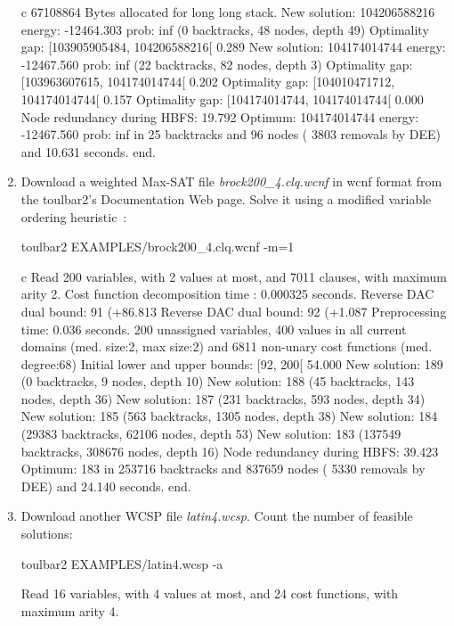 \begin{enumerate}
{\begin{DoxyCode}
c 67108864 Bytes allocated for long long stack.
New solution: 104206588216 energy: -12464.303 prob: inf (0 backtracks, 48 nodes, depth 49)
Optimality gap: [103905905484, 104206588216[ 0.289 %
New solution: 104174014744 energy: -12467.560 prob: inf (22 backtracks, 82 nodes, depth 3)
Optimality gap: [103963607615, 104174014744[ 0.202 %
Optimality gap: [104010471712, 104174014744[ 0.157 %
Optimality gap: [104174014744, 104174014744[ 0.000 %
Node redundancy during HBFS: 19.792 %
Optimum: 104174014744 energy: -12467.560 prob: inf in 25 backtracks and 96 nodes ( 3803 removals by DEE) and 10.631 seconds.
end.
\end{DoxyCode}}
\item Download a weighted Max-SAT file {\em brock200\_4.clq.wcnf} in wcnf format from the toulbar2's Documentation Web page. Solve it using a modified variable ordering heuristic~\cite{Schiex14a}:
\begin{DoxyCode}
	toulbar2 EXAMPLES/brock200_4.clq.wcnf -m=1
\end{DoxyCode}
{\scriptsize
\begin{DoxyCode}
c Read 200 variables, with 2 values at most, and 7011 clauses, with maximum arity 2.
Cost function decomposition time : 0.000325 seconds.
Reverse DAC dual bound: 91 (+86.813%
Reverse DAC dual bound: 92 (+1.087%
Preprocessing time: 0.036 seconds.
200 unassigned variables, 400 values in all current domains (med. size:2, max size:2) and 6811 non-unary cost functions (med. degree:68)
Initial lower and upper bounds: [92, 200[ 54.000%
New solution: 189 (0 backtracks, 9 nodes, depth 10)
New solution: 188 (45 backtracks, 143 nodes, depth 36)
New solution: 187 (231 backtracks, 593 nodes, depth 34)
New solution: 185 (563 backtracks, 1305 nodes, depth 38)
New solution: 184 (29383 backtracks, 62106 nodes, depth 53)
New solution: 183 (137549 backtracks, 308676 nodes, depth 16)
Node redundancy during HBFS: 39.423 %
Optimum: 183 in 253716 backtracks and 837659 nodes ( 5330 removals by DEE) and 24.140 seconds.
end.
\end{DoxyCode}}
\item Download another WCSP file {\em latin4.wcsp}. Count the number of feasible solutions:
\begin{DoxyCode}
	toulbar2 EXAMPLES/latin4.wcsp -a
\end{DoxyCode}
{\scriptsize
\begin{DoxyCode}
Read 16 variables, with 4 values at most, and 24 cost functions, with maximum arity 4.

\end{DoxyCode}}
\end{enumerate}
